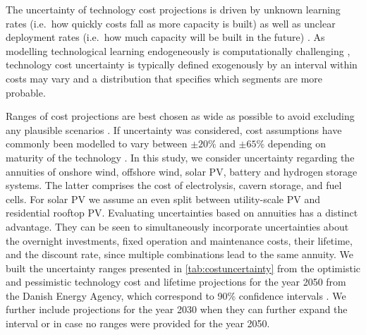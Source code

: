 The uncertainty of technology cost projections is driven 
by unknown learning rates (i.e.~how quickly costs fall as more capacity is built)
as well as unclear deployment rates (i.e.~how much capacity will be built in the future) \cite{gritsevskyi_modeling_2000,yeh_review_2012}.
As modelling technological learning endogeneously is computationally challenging \cite{heuberger_power_2017,mattsson_learning_2019},
technology cost uncertainty is typically defined exogenously by an interval within costs may vary
and a distribution that specifies which segments are more probable.


Ranges of cost projections are best chosen as wide as possible to avoid excluding any plausible scenarios \cite{moret_characterization_2017,mccollum_energy_2020}.
If uncertainty was considered, cost assumptions have commonly been modelled to vary between $\pm20\%$ and $\pm65\%$ depending on maturity of the technology \cite{moret_characterization_2017,shirizadeh_how_2019,pizarro-alonso_uncertainties_2019,li_using_2020,trondle_trade-offs_2020}.
In this study, we consider uncertainty regarding the annuities of
onshore wind, offshore wind, solar PV, battery and hydrogen storage systems.
The latter comprises the cost of
electrolysis, cavern storage, and fuel cells.
For solar PV we assume an even split between utility-scale PV and residential rooftop PV.
Evaluating uncertainties based on annuities has a distinct advantage.
They can be seen to simultaneously incorporate uncertainties about
the overnight investments, fixed operation and maintenance costs,
their lifetime, and the discount rate,
since multiple combinations lead to the same annuity.
We built the uncertainty ranges presented in \cref{tab:costuncertainty}
from the optimistic and pessimistic technology cost
and lifetime projections for the year 2050 from the Danish Energy Agency,
which correspond to 90\% confidence intervals \cite{DEA}.
We further include projections for the year 2030 when they can further expand the interval
or in case no ranges were provided for the year 2050. %


